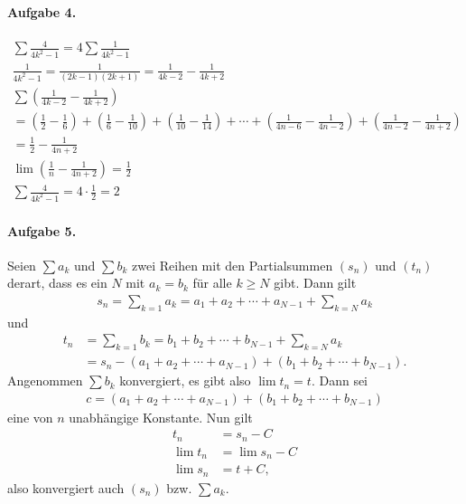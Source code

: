 \documentclass{article}
\begin{document}
\paragraph{Aufgabe 4.}

\begin{align*}
    \sum \frac{4}{4k^2 - 1} = 4 \sum\frac{1}{4k^2 - 1} \\
    \frac{1}{4k^2 - 1} = \frac{1}{(2k - 1)(2k + 1)} = \frac{1}{4k - 2} - \frac{1}{4k + 2} \\
    \sum \left(\frac{1}{4k - 2} - \frac{1}{4k + 2}\right) \\
    = \left(\frac{1}{2} - \frac{1}{6}\right) + \left(\frac{1}{6} - \frac{1}{10}\right) + \left(\frac{1}{10} - \frac{1}{14}\right) + \cdots + \left(\frac{1}{4n - 6} - \frac{1}{4n - 2}\right) + \left(\frac{1}{4n - 2} - \frac{1}{4n + 2}\right) \\
    = \frac{1}{2} - \frac{1}{4n + 2}\\
    \lim \left(\frac{1}{n} - \frac{1}{4n + 2}\right) = \frac{1}{2} \\
    \sum \frac{4}{4k^2 - 1} = 4 \cdot \frac{1}{2} = 2
\end{align*}

\paragraph{Aufgabe 5.}

Seien $\sum a_k$ und $\sum b_k$ zwei Reihen mit den Partialsummen $(s_n)$ und $(t_n)$ derart, dass es ein $N$ mit $a_k = b_k$ f\"ur alle $k \geq N$ gibt. Dann gilt
\begin{align*}
    s_n = \sum_{k = 1} a_k = a_1 + a_2 + \cdots + a_{N - 1} + \sum_{k = N} a_k
\end{align*}
und
\begin{align*}
    t_n &= \sum_{k = 1} b_k = b_1 + b_2 + \cdots + b_{N - 1} + \sum_{k = N} a_k \\
    &= s_n - (a_1 + a_2 + \cdots + a_{N - 1}) + (b_1 + b_2 + \cdots + b_{N - 1}).
\end{align*}
Angenommen $\sum b_k$ konvergiert, es gibt also $\lim t_n = t$. Dann sei
\begin{align*}
    c = (a_1 + a_2 + \cdots + a_{N - 1}) + (b_1 + b_2 + \cdots + b_{N - 1})
\end{align*}
eine von $n$ unabh\"angige Konstante. Nun gilt
\begin{align*}
    t_n &= s_n - C \\
    \lim t_n &= \lim s_n - C \\
    \lim s_n &= t + C,
\end{align*}
also konvergiert auch $(s_n)$ bzw. $\sum a_k$.
\end{document}
